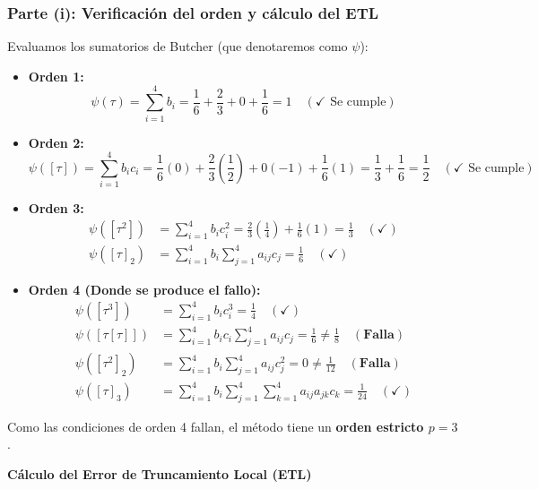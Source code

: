 \begin{sol}
\subsubsection*{Parte (i): Verificación del orden y cálculo del ETL}
Evaluamos los sumatorios de Butcher (que denotaremos como $\psi$):

\begin{itemize}
    \item \textbf{Orden 1:} 
    \[
    \psi(\tau) = \sum_{i=1}^4 b_i = \frac{1}{6} + \frac{2}{3} + 0 + \frac{1}{6} = 1 \quad (\checkmark \text{ Se cumple})
    \]
    \item \textbf{Orden 2:} 
    \[
    \psi ([\tau]) = \sum_{i=1}^4 b_i c_i = \frac{1}{6}(0) + \frac{2}{3}\left(\frac{1}{2}\right) + 0(-1) + \frac{1}{6}(1) = \frac{1}{3} + \frac{1}{6} = \frac{1}{2} \quad (\checkmark \text{ Se cumple})
    \]
    \item \textbf{Orden 3:} 
    \begin{align*}
        \psi ([\tau^2])  &= \sum_{i=1}^4 b_i c_i^2 = \frac{2}{3}\left(\frac{1}{4}\right) + \frac{1}{6}(1) = \frac{1}{3} \quad (\checkmark) \\
        \psi ([\tau]_2)  &= \sum_{i=1}^4 b_i \sum_{j=1}^4 a_{ij} c_j = \frac{1}{6} \quad (\checkmark)
    \end{align*}
    \item \textbf{Orden 4 (Donde se produce el fallo):}
    \begin{align*}
        \psi ([\tau^3])  &= \sum_{i=1}^4 b_i c_i^3 = \frac{1}{4} \quad (\checkmark) \\
        \psi ([\tau[\tau]]) &= \sum_{i=1}^4 b_i c_i \sum_{j=1}^4 a_{ij} c_j = \frac{1}{6} \neq \frac{1}{8} \quad (\mathbf{\text{Falla}}) \\
        \psi ([\tau^2]_2) &= \sum_{i=1}^4 b_i \sum_{j=1}^4 a_{ij} c_j^2 = 0 \neq \frac{1}{12} \quad (\mathbf{\text{Falla}}) \\
        \psi ([\tau]_3) &= \sum_{i=1}^4 b_i \sum_{j=1}^4 \sum_{k=1}^4 a_{ij} a_{jk} c_k = \frac{1}{24} \quad (\checkmark)
    \end{align*}
\end{itemize}

Como las condiciones de orden 4 fallan, el método tiene un \textbf{orden estricto $p = 3$}.

\noindent \textbf{Cálculo del Error de Truncamiento Local (ETL)} 


\end{sol}
